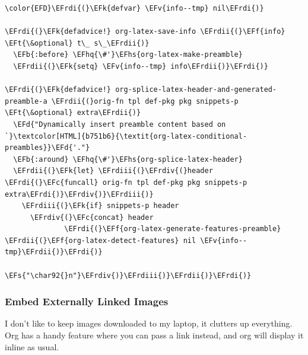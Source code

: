 \documentclass{scrartcl}
\newcommand{\EFk}[1]{\textcolor{EFk}{#1}} %
\newcommand{\EFd}[1]{\textcolor{EFd}{\textit{#1}}} %
\newcommand{\EFt}[1]{\textcolor{EFt}{#1}} %
\newcommand{\EFs}[1]{\textcolor{EFs}{#1}} %
\newcommand{\EFb}[1]{\textcolor{EFb}{#1}} %
\newcommand{\EFc}[1]{\textcolor{EFc}{#1}} %
\newcommand{\EFv}[1]{\textcolor{EFv}{#1}} %
\newcommand{\EFf}[1]{\textcolor{EFf}{#1}} %
\newcommand{\EFhq}[1]{\textcolor{EFhq}{#1}} %
\newcommand{\EFhs}[1]{\textcolor{EFhs}{#1}} %
\newcommand{\EFrdi}[1]{\textcolor{EFrdi}{#1}} %
\newcommand{\EFrdii}[1]{\textcolor{EFrdii}{#1}} %
\newcommand{\EFrdiii}[1]{\textcolor{EFrdiii}{#1}} %
\newcommand{\EFrdiv}[1]{\textcolor{EFrdiv}{#1}} %
\begin{document}
\begin{Code}
\begin{Verbatim}[]
\color{EFD}\EFrdi{(}\EFk{defvar} \EFv{info--tmp} nil\EFrdi{)}

\EFrdi{(}\EFk{defadvice!} org-latex-save-info \EFrdii{(}\EFf{info} \EFt{\&optional} t\_ s\_\EFrdii{)}
  \EFb{:before} \EFhq{\#'}\EFhs{org-latex-make-preamble}
  \EFrdii{(}\EFk{setq} \EFv{info--tmp} info\EFrdii{)}\EFrdi{)}

\EFrdi{(}\EFk{defadvice!} org-splice-latex-header-and-generated-preamble-a \EFrdii{(}orig-fn tpl def-pkg pkg snippets-p \EFt{\&optional} extra\EFrdii{)}
  \EFd{"Dynamically insert preamble content based on `}\textcolor[HTML]{b751b6}{\textit{org-latex-conditional-preambles}}\EFd{'."}
  \EFb{:around} \EFhq{\#'}\EFhs{org-splice-latex-header}
  \EFrdii{(}\EFk{let} \EFrdiii{(}\EFrdiv{(}header \EFrdi{(}\EFc{funcall} orig-fn tpl def-pkg pkg snippets-p extra\EFrdi{)}\EFrdiv{)}\EFrdiii{)}
    \EFrdiii{(}\EFk{if} snippets-p header
      \EFrdiv{(}\EFc{concat} header
              \EFrdi{(}\EFf{org-latex-generate-features-preamble} \EFrdii{(}\EFf{org-latex-detect-features} nil \EFv{info--tmp}\EFrdii{)}\EFrdi{)}
              \EFs{"\char92{}n"}\EFrdiv{)}\EFrdiii{)}\EFrdii{)}\EFrdi{)}
\end{Verbatim}
\end{Code}

\subsubsection{Embed Externally Linked Images}
\label{sec:org5e98dd2}
I don't like to keep images downloaded to my laptop, it clutters up everything.
Org has a handy feature where you can pass a link instead, and org will display
it inline as usual.
\end{document}

